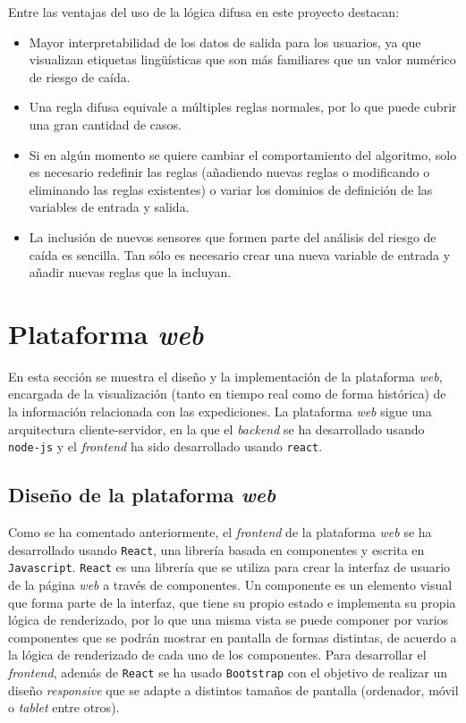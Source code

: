 Entre las ventajas del uso de la lógica difusa en este proyecto destacan:

\begin{itemize}
\item Mayor interpretabilidad de los datos de salida para los usuarios, ya que visualizan etiquetas lingüísticas que son más familiares que un valor numérico de riesgo de caída.
\item Una regla difusa equivale a múltiples reglas normales, por lo que puede cubrir una gran cantidad de casos.
\item Si en algún momento se quiere cambiar el comportamiento del algoritmo, solo es necesario redefinir las reglas (añadiendo nuevas reglas o modificando o eliminando las reglas existentes) o variar los dominios de definición de las variables de entrada y salida.
\item La inclusión de nuevos sensores que formen parte del análisis del riesgo de caída es sencilla. Tan sólo es necesario crear una nueva variable de entrada y añadir nuevas reglas que la incluyan.
\end{itemize}

\section{Plataforma \textit{web}}
\label{platformweb}

En esta sección se muestra el diseño y la implementación de la plataforma \textit{web}, encargada de la visualización (tanto en tiempo real como de forma histórica) de la información relacionada con las expediciones. La plataforma \textit{web} sigue una arquitectura cliente-servidor, en la que el \textit{backend} se ha desarrollado usando \texttt{node-js} y el \textit{frontend} ha sido desarrollado usando \texttt{react}.

\subsection{Diseño de la plataforma \textit{web}}

Como se ha comentado anteriormente, el \textit{frontend} de la plataforma \textit{web} se ha desarrollado usando \texttt{React}, una librería basada en componentes y escrita en \texttt{Javascript}. \texttt{React} es una librería que se utiliza para crear la interfaz de usuario de la página \textit{web} a través de componentes. Un componente es un elemento visual que forma parte de la interfaz, que tiene su propio estado e implementa su propia lógica de renderizado, por lo que una misma vista se puede componer por varios componentes que se podrán mostrar en pantalla de formas distintas, de acuerdo a la lógica de renderizado de cada uno de los componentes. Para desarrollar el \textit{frontend}, además de \texttt{React} se ha usado \texttt{Bootstrap} con el objetivo de realizar un diseño \textit{responsive} que se adapte a distintos tamaños de pantalla (ordenador, móvil o \textit{tablet} entre otros). 

